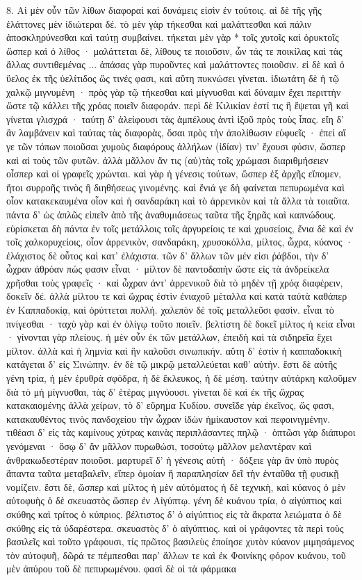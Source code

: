 \documentclass[a4paper, 11pt, oneside, polutonikogreek, german]{article}
\begin{document}
8. Αἱ μὲν οὖν τῶν λίθων διαφοραὶ καὶ δυνάμεις εἰσὶν ἐν τούτοις. αἱ δὲ τῆς γῆς ἐλάττονες μὲν ἰδιώτεραι δέ. τὸ μὲν γὰρ τήκεσθαι καὶ μαλάττεσθαι καὶ πάλιν ἀποσκληρύνεσθαι καὶ ταύτῃ συμβαίνει. τήκεται μὲν γὰρ * τοῖς χυτοῖς καὶ ὀρυκτοῖς ὥσπερ καὶ ὁ λίθος · μαλάττεται δὲ, λίθους τε ποιοῦσιν, ὧν τάς τε ποικίλας καὶ τὰς ἄλλας συντιθεμένας ... ἁπάσας γὰρ πυροῦντες καὶ μαλάττοντες ποιοῦσιν. εἰ δὲ καὶ ὁ ὕελος ἐκ τῆς ὑελίτιδος ὥς τινές φασι, καὶ αὕτη πυκνώσει γίνεται. ἰδιωτάτη δὲ ἡ τῷ χαλκῷ μιγνυμένη · πρὸς γὰρ τῷ τήκεσθαι καὶ μίγνυσθαι καὶ δύναμιν ἔχει περιττὴν ὥστε τῷ κάλλει τῆς χρόας ποιεῖν διαφοράν. περὶ δὲ Κιλικίαν ἐστί τις ἣ ἕψεται γῆ καὶ γίνεται γλισχρά · ταύτῃ δ' ἀλείφουσι τὰς ἀμπέλους ἀντὶ ἰξοῦ πρὸς τοὺς ἶπας. εἴη δ' ἂν λαμβάνειν καὶ ταύτας τὰς διαφορὰς, ὅσαι πρὸς τὴν ἀπολίθωσιν εὐφυεῖς · ἐπεὶ αἵ γε τῶν τόπων ποιοῦσαι χυμοὺς διαφόρους ἀλλήλων (ἰδίαν) τιν' ἔχουσι φύσιν, ὥσπερ καὶ αἱ τοὺς τῶν φυτῶν. ἀλλὰ μᾶλλον ἄν τις (αὐ)τὰς τοῖς χρώμασι διαριθμήσειεν οἷσπερ καὶ οἱ γραφεῖς χρώνται. καὶ γὰρ ἡ γένεσις τούτων, ὥσπερ ἐξ ἀρχῆς εἴπομεν, ἤτοι συρροῆς τινὸς ἢ διηθήσεως γινομένης. καὶ ἔνιά γε δὴ φαίνεται πεπυρωμένα καὶ οἷον κατακεκαυμένα οἷον καὶ ἡ σανδαράκη καὶ τὸ ἀρρενικὸν καὶ τὰ ἄλλα τὰ τοιαῦτα. πάντα δ' ὡς ἁπλῶς εἰπεῖν ἀπὸ τῆς ἀναθυμιάσεως ταῦτα τῆς ξηρᾶς καὶ καπνώδους. εὑρίσκεται δὴ πάντα ἐν τοῖς μετάλλοις τοῖς ἀργυρείοις τε καὶ χρυσείοις, ἔνια δὲ καὶ ἐν τοῖς χαλκορυχείοις, οἷον ἀρρενικὸν, σανδαράκη, χρυσοκόλλα, μίλτος, ὦχρα, κύανος · ἐλάχιστος δὲ οὗτος καὶ κατ' ἐλάχιστα. τῶν δ' ἄλλων τῶν μέν εἰσι ῥάβδοι, τὴν δ' ὦχραν ἀθρόαν πώς φασιν εἶναι · μίλτον δὲ παντοδαπὴν ὥστε εἰς τὰ ἀνδρείκελα χρῆσθαι τοὺς γραφεῖς · καὶ ὦχραν ἀντ' ἀρρενικοῦ διὰ τὸ μηδὲν τῇ χρόᾳ διαφέρειν, δοκεῖν δέ. ἀλλὰ μίλτου τε καὶ ὥχρας ἐστὶν ἐνιαχοῦ μέταλλα καὶ κατὰ ταὐτὰ καθάπερ ἐν Καππαδοκίᾳ, καὶ ὀρύττεται πολλή. χαλεπὸν δὲ τοῖς μεταλλεῦσι φασὶν. εἶναι τὸ πνίγεσθαι · ταχὺ γὰρ καὶ ἐν ὀλίγῳ τοῦτο ποιεῖν. βελτίστη δὲ δοκεῖ μίλτος ἡ κεία εἶναι · γίνονται γὰρ πλείους. ἡ μὲν οὖν ἐκ τῶν μετάλλων, ἐπειδὴ καὶ τὰ σιδηρεῖα ἔχει μίλτον. ἀλλὰ καὶ ἡ λημνία καὶ ἣν καλοῦσι σινωπικήν. αὕτη δ' ἐστὶν ἡ καππαδοκικὴ κατάγεται δ' εἰς Σινώπην. ἐν δὲ τῷ μικρῷ μεταλλεύεται καθ' αὑτήν. ἔστι δὲ αὐτῆς γένη τρία, ἡ μὲν ἐρυθρὰ σφόδρα, ἡ δὲ ἔκλευκος, ἡ δὲ μέση. ταύτην αὐτάρκη καλοῦμεν διὰ τὸ μὴ μίγνυσθαι, τὰς δ' ἑτέρας μιγνύουσι. γίνεται δὲ καὶ ἐκ τῆς ὤχρας κατακαιομένης ἀλλὰ χείρων, τὸ δ' εὕρημα Κυδίου. συνεῖδε γὰρ ἐκεῖνος, ὥς φασι, κατακαυθέντος τινὸς πανδοχείου τὴν ὦχραν ἰδὼν ἡμίκαυστον καὶ πεφοινιγμένην. τιθέασι δ' εἰς τὰς καμίνους χύτρας καινὰς περιπλάσαντες πηλῷ · ὀπτῶσι γὰρ διάπυροι γενόμεναι · ὅσῳ δ' ἄν μᾶλλον πυρωθώσι, τοσούτῳ μᾶλλον μελαντέραν καὶ ἀνθρακωδεστέραν ποιοῦσι. μαρτυρεῖ δ' ἡ γένεσις αὐτή · δόξειε γὰρ ἂν ὑπὸ πυρὸς ἅπαντα ταῦτα μεταβαλεῖν, εἴπερ ὁμοίαν ἢ παραπλησίαν δεῖ τὴν ἐνταῦθα τῇ φυσικῇ νομίζειν. ἔστι δὲ, ὥσπερ καὶ μίλτος ἡ μὲν αὐτόματος ἡ δὲ τεχνικὴ, καὶ κύανος ὁ μὲν αὐτοφυὴς ὁ δὲ σκευαστὸς ὥσπερ ἐν Αἰγύπτῳ. γένη δὲ κυάνου τρία, ὁ αἰγύπτιος καὶ σκύθης καὶ τρίτος ὁ κύπριος. βέλτιστος δ' ὁ αἰγύπτιος εἰς τὰ ἄκρατα λειώματα ὁ δὲ σκύθης εἰς τὰ ὑδαρέστερα. σκευαστὸς δ' ὁ αἰγύπτιος. καὶ οἱ γράφοντες τὰ περὶ τοὺς βασιλεῖς καὶ τοῦτο γράφουσι, τίς πρῶτος βασιλεὺς ἐποίησε χυτὸν κύανον μιμησάμενος τὸν αὐτοφυῆ, δῶρά τε πέμπεσθαι παρ' ἄλλων τε καὶ ἐκ Φοινίκης φόρον κυάνου, τοῦ μὲν ἀπύρου τοῦ δὲ πεπυρωμένου. φασὶ δὲ οἱ τὰ φάρμακα 
\end{document}
